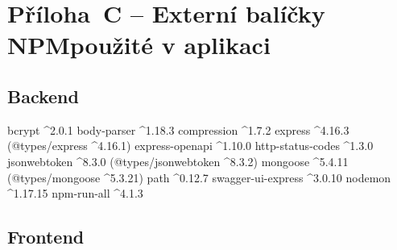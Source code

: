 \documentclass[a4paper,12pt]{article}
\begin{document}
\section*{Příloha~C --  Externí balíčky NPM\newline použité v aplikaci}

\subsection*{Backend}

\begin{code}
bcrypt \textasciicircum2.0.1\newline
body-parser \textasciicircum1.18.3\newline
compression \textasciicircum1.7.2\newline
express \textasciicircum4.16.3 (@types/express \textasciicircum4.16.1)\newline
express-openapi \textasciicircum1.10.0\newline
http-status-codes \textasciicircum1.3.0\newline
jsonwebtoken \textasciicircum8.3.0 (@types/jsonwebtoken \textasciicircum8.3.2)\newline
mongoose \textasciicircum5.4.11 (@types/mongoose \textasciicircum5.3.21) \newline
path \textasciicircum0.12.7\newline
swagger-ui-express \textasciicircum3.0.10\newline
nodemon \textasciicircum1.17.15\newline
npm-run-all \textasciicircum4.1.3
\end{code}

\subsection*{Frontend}
\end{document}
